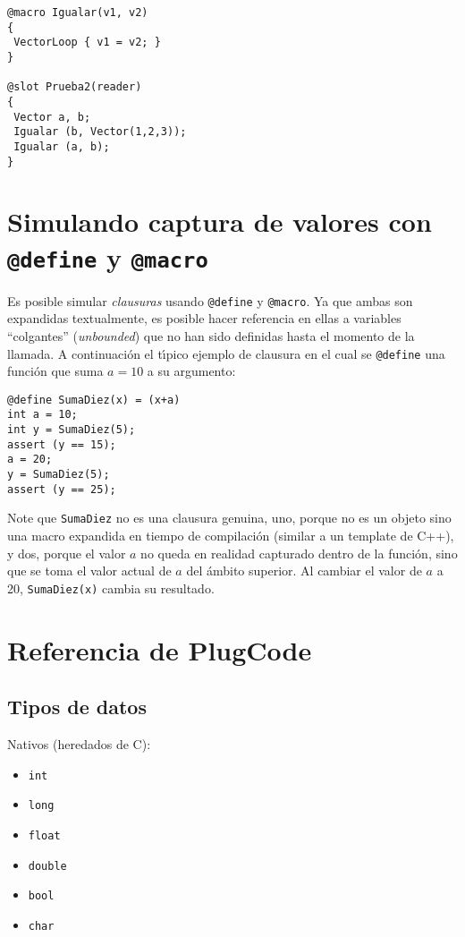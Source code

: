 \documentclass[a4paper,12pt]{article}
\begin{document}
\lstset{language=C}
\begin{lstlisting}
@macro Igualar(v1, v2)
{
 VectorLoop { v1 = v2; }
}

@slot Prueba2(reader)
{
 Vector a, b;
 Igualar (b, Vector(1,2,3));
 Igualar (a, b);
}
\end{lstlisting}

\section{Simulando captura de valores con \texttt{@define} y \texttt{@macro}}

Es posible simular \emph{clausuras} usando \texttt{@define} y \texttt{@macro}.
Ya que ambas son expandidas textualmente, es posible hacer referencia en ellas a
variables ``colgantes'' (\emph{unbounded}) que no han sido definidas hasta el
momento de la llamada. A continuaci\'on el t\'{\i}pico ejemplo de clausura en el
cual se \verb'@define' una funci\'on que suma $a=10$ a su argumento:

\lstset{language=C}
\begin{lstlisting}
@define SumaDiez(x) = (x+a)
int a = 10;
int y = SumaDiez(5);
assert (y == 15);
a = 20;
y = SumaDiez(5);
assert (y == 25);
\end{lstlisting}

Note que \verb'SumaDiez' no es una clausura genuina, uno, porque no es un objeto
sino una macro expandida en tiempo de compilaci\'on (similar a un template de
C++), y dos, porque el valor $a$ no queda en realidad capturado dentro de la
funci\'on, sino que se toma el valor actual de $a$ del \'ambito superior. Al 
cambiar el valor de $a$ a 20, \verb'SumaDiez(x)' cambia su resultado.

\section{Referencia de PlugCode}

\subsection{Tipos de datos}

Nativos (heredados de C):

\begin{itemize}
\item \verb'int'
\item \verb'long'
\item \verb'float'
\item \verb'double'
\item \verb'bool'
\item \verb'char'
\end{itemize}
\end{document}
